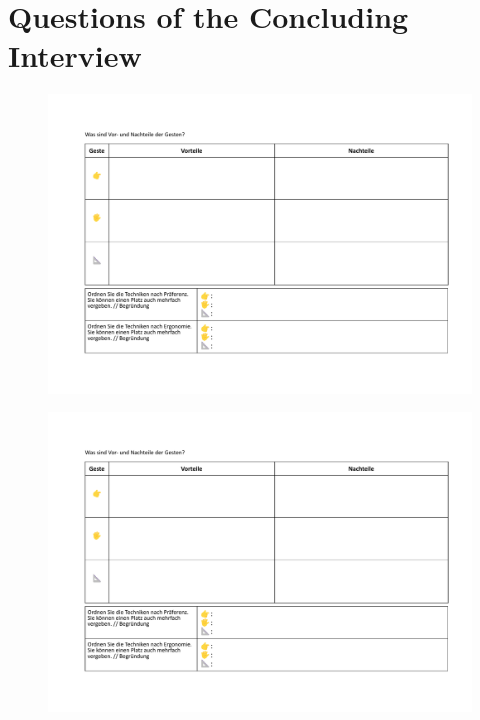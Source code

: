 \section{Questions of the Concluding Interview}
\begin{figure}[!h]
\centering
\includegraphics[page=1,width=\textwidth]{figures/Appendix/interview.pdf}
\end{figure}
\begin{figure}[!h]
\centering
\includegraphics[page=2,width=\textwidth]{figures/Appendix/interview.pdf}
\end{figure}

